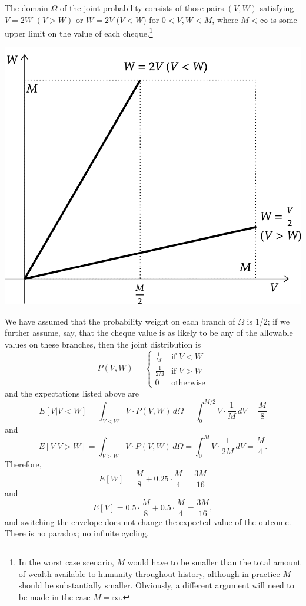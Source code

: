 \begin{Example}
The domain $\Omega$ of the joint probability consists of those pairs $(V,W)$ satisfying $V=2W$ $(V>W)$ or $W=2V$ ($V<W$) for $0<V,W<M$, where $M<\infty$ is some upper limit on the value of each cheque.\footnote{In the worst case scenario, $M$ would have to be smaller than the total amount of wealth available to humanity throughout history, although in practice $M$ should be substantially smaller. Obviously, a different argument will need to be made in the case $M=\infty$.}
\begin{center}
\includegraphics[width=0.9\linewidth]{Images/envelope.png}
\end{center}
\noindent We have assumed that the probability weight on each branch of $\Omega$ is 1/2; if we further assume, say, that the cheque value is as likely to be any of the allowable values on these branches, then the joint distribution is 
$$P(V,W)=\begin{cases}
\frac{1}{M} & \text{if $V<W$} \\
\frac{1}{2M} & \text{if $V>W$} \\
0 & \text{otherwise}
\end{cases}$$
and the expectations listed above are 
$$E[V|V<W]=\int_{V<W}\!\!\!\!\!\!\!\!\!\!\! V\cdot P(V,W)\, d\Omega = \int_{0}^{M/2}\!\!\!\!\!\!\!\!V\cdot\frac{1}{M}\, dV=\frac{M}{8} $$ and $$E[V|V>W]=\int_{V>W}\!\!\!\!\!\!\!\!\!\!\! V\cdot P(V,W)\, d\Omega = \int_{0}^{M}\!\!\!\!V\cdot\frac{1}{2M}\, dV=\frac{M}{4}.$$ Therefore, $$E[W]=\frac{M}{8}+0.25\cdot \frac{M}{4}=\frac{3M}{16}$$ and $$E[V]=0.5\cdot \frac{M}{8}+0.5\cdot \frac{M}{4}=\frac{3M}{16},$$ and switching the envelope does not change the expected value of the outcome. There is no paradox; no infinite cycling.
\end{Example}

